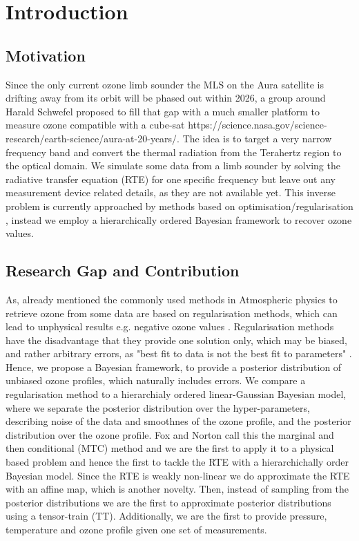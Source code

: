 \chapter{Introduction}
\section{Motivation}

Since the only current ozone limb sounder the MLS on the Aura satellite is drifting away from its orbit will be phased out within 2026, a group around Harald Schwefel proposed to fill that gap with a much smaller platform to measure ozone compatible with a cube-sat  https://science.nasa.gov/science-research/earth-science/aura-at-20-years/.
The idea is to target a very narrow frequency band and convert the thermal radiation from the Terahertz region to the optical domain.
We simulate some data from a limb sounder by solving the radiative transfer equation (RTE) for one specific frequency but leave out any measurement device related details, as they are not available yet.
This inverse problem is currently approached by methods based on optimisation/regularisation \cite{}, instead we employ a hierarchically ordered Bayesian framework to recover ozone values.


\section{Research Gap and Contribution}
As, already mentioned the commonly used methods in Atmospheric physics to retrieve ozone from some data are based on regularisation methods, which can lead to unphysical results e.g. negative ozone values \cite{MLSdata}.
Regularisation methods have the disadvantage that they provide one solution only, which may be biased, and rather arbitrary errors, as "best fit to data is not the best fit to parameters" \cite{tan2016LecNot}.
Hence, we propose a Bayesian framework, to provide a posterior distribution of unbiased ozone profiles, which naturally includes errors.
We compare a regularisation method to a hierarchialy ordered linear-Gaussian Bayesian model, where we separate the posterior distribution over the hyper-parameters, describing noise of the data and smoothnes of the ozone profile, and the posterior distribution over the ozone profile.
Fox and Norton call this the marginal and then conditional (MTC) method \cite{} and we are the first to apply it to a physical based problem and hence the first to tackle the RTE with a hierarchichally order Bayesian model.
Since the RTE is weakly non-linear we do approximate the RTE with an affine map, which is another novelty.
Then, instead of sampling from the posterior distributions we are the first to approximate posterior distributions using a tensor-train (TT).
Additionally, we are the first to provide pressure, temperature and ozone profile given one set of measurements.

